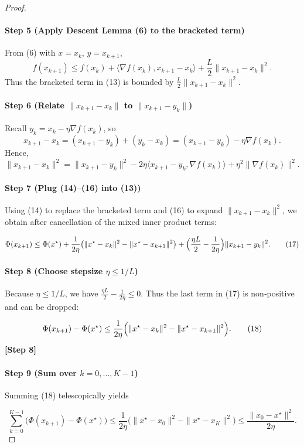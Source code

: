 \documentclass{article}
\begin{document}
\begin{proof}
\paragraph{Step 5 (Apply Descent Lemma (6) to the bracketed term)}
From (6) with $x=x_{k}$, $y=x_{k+1}$,
\[
f(x_{k+1})\le f(x_{k})+\langle\nabla f(x_{k}),x_{k+1}-x_{k}\rangle
+\frac{L}{2}\|x_{k+1}-x_{k}\|^{2}.
\tag{14}
\]
Thus the bracketed term in (13) is bounded by $\frac{L}{2}\|x_{k+1}-x_{k}\|^{2}$.

\paragraph{Step 6 (Relate $\|x_{k+1}-x_{k}\|$ to $\|x_{k+1}-y_{k}\|$)}
Recall $y_{k}=x_{k}-\eta\nabla f(x_{k})$, so
\[
x_{k+1}-x_{k}= (x_{k+1}-y_{k}) + (y_{k}-x_{k})
= (x_{k+1}-y_{k}) -\eta\nabla f(x_{k}).
\tag{15}
\]
Hence,
\[
\|x_{k+1}-x_{k}\|^{2}
= \|x_{k+1}-y_{k}\|^{2}
-2\eta\langle x_{k+1}-y_{k},\nabla f(x_{k})\rangle
+\eta^{2}\|\nabla f(x_{k})\|^{2}.
\tag{16}
\]

\paragraph{Step 7 (Plug (14)–(16) into (13))}
Using (14) to replace the bracketed term and (16) to expand $\|x_{k+1}-x_{k}\|^{2}$, we obtain after cancellation of the mixed inner product terms:

\[
\Phi(x_{k+1})\le \Phi(x^{\star})
+\frac{1}{2\eta}\bigl(\|x^{\star}-x_{k}\|^{2}-\|x^{\star}-x_{k+1}\|^{2}\bigr)
+\Bigl(\frac{\eta L}{2}-\frac{1}{2\eta}\Bigr)\|x_{k+1}-y_{k}\|^{2}.
\tag{17}
\]

\paragraph{Step 8 (Choose stepsize $\eta\le 1/L$)}
Because $\eta\le 1/L$, we have $\frac{\eta L}{2}-\frac{1}{2\eta}\le 0$.  
Thus the last term in (17) is non‑positive and can be dropped:

\[
\Phi(x_{k+1})-\Phi(x^{\star})
\le\frac{1}{2\eta}\Bigl(\|x^{\star}-x_{k}\|^{2}-\|x^{\star}-x_{k+1}\|^{2}\Bigr).
\tag{18}
\]
\textbf{[Step 8]}

\paragraph{Step 9 (Sum over $k=0,\dots,K-1$)}
Summing (18) telescopically yields

\[
\sum_{k=0}^{K-1}\bigl(\Phi(x_{k+1})-\Phi(x^{\star})\bigr)
\le\frac{1}{2\eta}\bigl(\|x^{\star}-x_{0}\|^{2}-\|x^{\star}-x_{K}\|^{2}\bigr)
\le\frac{\|x_{0}-x^{\star}\|^{2}}{2\eta}.
\tag{19}
\]


\end{proof}
\end{document}
